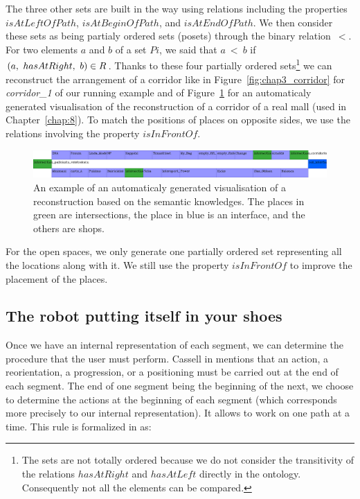 The three other sets are built in the way using relations including the properties $isAtLeftOfPath$, $isAtBeginOfPath$, and $isAtEndOfPath$. We then consider these sets as being partialy ordered sets (posets) through the binary relation~$<$. For two elements $a$ and $b$ of a set $Pi$, we said that $a\ <\ b$ if $(a,\ hasAtRight,\ b) \in R$. Thanks to these four partially ordered sets\footnote{The sets are not totally ordered because we do not consider the transitivity of the relations $hasAtRight$ and $hasAtLeft$ directly in the ontology. Consequently not all the elements can be compared.} we can reconstruct the arrangement of a corridor like in Figure~\ref{fig:chap3_corridor} for \textit{corridor\_1} of our running example and of Figure~\ref{fig:chap3_pallokatu} for an automaticaly generated visualisation of the reconstruction of a corridor of a real mall (used in Chapter~\ref{chap:8}). To match the positions of places on opposite sides, we use the relations involving the property $isInFrontOf$.

\begin{figure}[ht!]
\centering
\includegraphics[width=\textwidth]{figures/chapter3/pallokatu.png}
\caption{\label{fig:chap3_pallokatu} An example of an automaticaly generated visualisation of a reconstruction based on the semantic knowledges. The places in green are intersections, the place in blue is an interface, and the others are shops. }
\end{figure}

For the open spaces, we only generate one partially ordered set representing all the locations along with it. We still use the property $isInFrontOf$ to improve the placement of the places.

\subsection{The robot putting itself in your shoes}

Once we have an internal representation of each segment, we can determine the procedure that the user must perform. Cassell in \cite{cassell_2007_trading} mentions that an action, a reorientation, a progression, or a positioning must be carried out at the end of each segment. The end of one segment being the beginning of the next, we choose to determine the actions at the beginning of each segment (which corresponds more precisely to our internal representation). It allows to work on one path at a time. This rule is formalized in \cite{mallot_2009_embodied} as:

